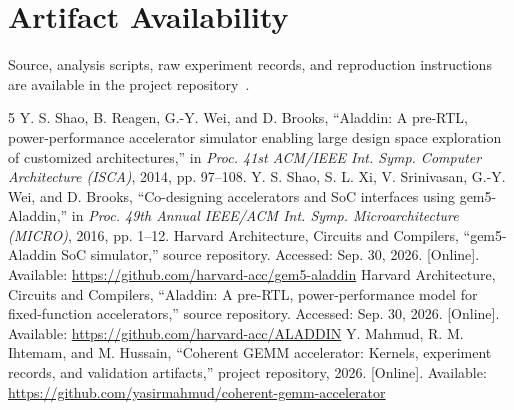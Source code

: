 \documentclass[conference,letterpaper]{IEEEtran}
\begin{document}
\section*{Artifact Availability}
Source, analysis scripts, raw experiment records, and reproduction
instructions are available in the project repository~\cite{artifacts}.

\begin{thebibliography}{5}
Y. S. Shao, B. Reagen, G.-Y. Wei, and D. Brooks,
``Aladdin: A pre-RTL, power-performance accelerator simulator enabling
large design space exploration of customized architectures,''
in \emph{Proc. 41st ACM/IEEE Int. Symp. Computer Architecture (ISCA)}, 2014,
pp. 97--108.
Y. S. Shao, S. L. Xi, V. Srinivasan, G.-Y. Wei, and D. Brooks,
``Co-designing accelerators and SoC interfaces using gem5-Aladdin,''
in \emph{Proc. 49th Annual IEEE/ACM Int. Symp. Microarchitecture (MICRO)},
2016, pp. 1--12.
Harvard Architecture, Circuits and Compilers, ``gem5-Aladdin SoC
simulator,'' source repository. Accessed: Sep. 30, 2026. [Online].
Available: \url{https://github.com/harvard-acc/gem5-aladdin}
Harvard Architecture, Circuits and Compilers, ``Aladdin: A pre-RTL,
power-performance model for fixed-function accelerators,'' source
repository. Accessed: Sep. 30, 2026. [Online]. Available:
\url{https://github.com/harvard-acc/ALADDIN}
Y. Mahmud, R. M. Ihtemam, and M. Hussain, ``Coherent GEMM accelerator:
Kernels, experiment records, and validation artifacts,'' project
repository, 2026. [Online]. Available:
\url{https://github.com/yasirmahmud/coherent-gemm-accelerator}
\end{thebibliography}
\end{document}
